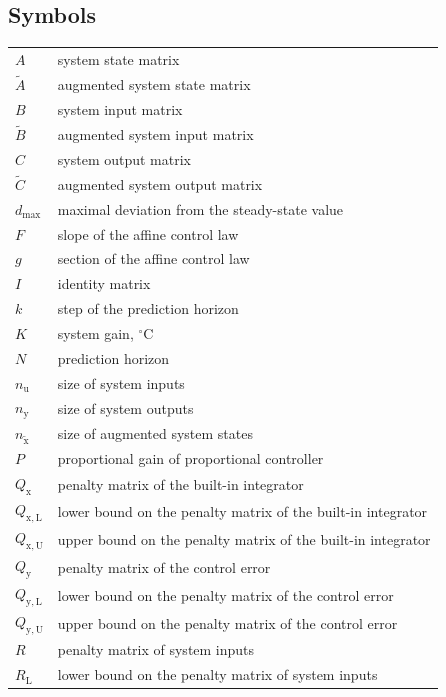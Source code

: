 \documentclass[preprint,12pt]{elsarticle}
\begin{document}
	\subsection*{Symbols}
		\begin{tabular}{ l l }
			$A$ & system state matrix \\
			$\widetilde{A}$ & augmented system state matrix \\
			$B$ & system input matrix \\
			$\widetilde{B}$ & augmented system input matrix \\
			$C$ & system output matrix \\
			$\widetilde{C}$ & augmented system output matrix \\
			$d_{\max}$ & maximal deviation from the steady-state value \\
			$F$ & slope of the affine control law \\
			$g$ & section of the affine control law \\
			$I$ & identity matrix \\
			$k$ & step of the prediction horizon \\
			$K$ & system gain, $^{\circ}\mathrm{C}$\\
			$N$ & prediction horizon \\
			$n_{\mathrm{u}}$ & size of system inputs \\
			$n_{\mathrm{y}}$ & size of system outputs \\
			$n_{\widetilde{\mathrm{x}}}$ & size of augmented system states \\
			$P$ & proportional gain of proportional controller\\
			$Q_{\mathrm{x}}$ & penalty matrix of the built-in integrator \\
			$Q_{\mathrm{x,L}}$ & lower bound on the penalty matrix of the built-in integrator \\
			$Q_{\mathrm{x,U}}$ & upper bound on the penalty matrix of the built-in integrator \\
			$Q_{\mathrm{y}}$ & penalty matrix of the control error \\
			$Q_{\mathrm{y,L}}$ & lower bound on the penalty matrix of the control error \\
			$Q_{\mathrm{y,U}}$ & upper bound on the penalty matrix of the control error \\
			$R$ & penalty matrix of system inputs \\
			$R_{\mathrm{L}}$ & lower bound on the penalty matrix of system inputs \\

\end{tabular}
\end{document}
